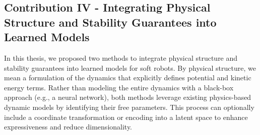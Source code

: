 \subsection{Contribution IV - Integrating Physical Structure and Stability Guarantees into Learned Models}
In this thesis, we proposed two methods to integrate physical structure and stability guarantees into learned models for soft robots. By physical structure, we mean a formulation of the dynamics that explicitly defines potential and kinetic energy terms. Rather than modeling the entire dynamics with a black-box approach (e.g., a neural network), both methods leverage existing physics-based dynamic models by identifying their free parameters. This process can optionally include a coordinate transformation or encoding into a latent space to enhance expressiveness and reduce dimensionality.

